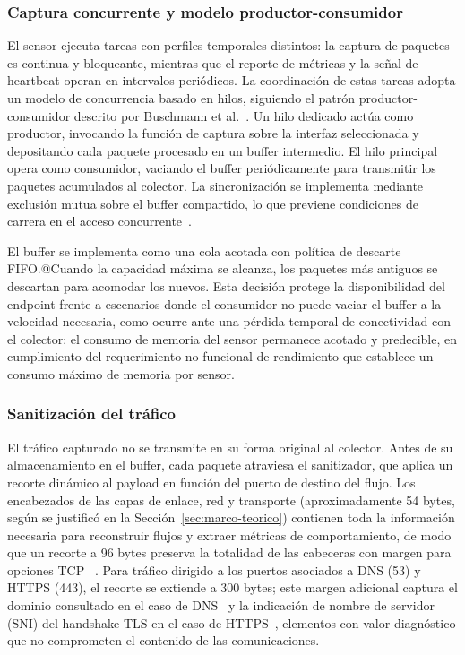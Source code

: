 \subsubsection{Captura concurrente y modelo productor-consumidor}

El sensor ejecuta tareas con perfiles temporales distintos: la 
captura de paquetes es continua y bloqueante, mientras que el 
reporte de métricas y la señal de heartbeat operan en intervalos 
periódicos. La coordinación de estas tareas adopta un modelo de 
concurrencia basado en hilos, siguiendo el patrón productor-consumidor 
descrito por Buschmann et al.~\cite{buschmann1996posa}. Un hilo 
dedicado actúa como productor, invocando la función de captura sobre 
la interfaz seleccionada y depositando cada paquete procesado en un 
buffer intermedio. El hilo principal opera como consumidor, vaciando 
el buffer periódicamente para transmitir los paquetes acumulados al 
colector. La sincronización se implementa mediante exclusión mutua 
sobre el buffer compartido, lo que previene condiciones de carrera 
en el acceso concurrente~\cite{silberschatz2018os}.

El buffer se implementa como una cola acotada con política de 
descarte FIFO.@Cuando la capacidad máxima se alcanza, los paquetes 
más antiguos se descartan para acomodar los nuevos. Esta decisión 
protege la disponibilidad del endpoint frente a escenarios donde el 
consumidor no puede vaciar el buffer a la velocidad necesaria, como 
ocurre ante una pérdida temporal de conectividad con el colector: 
el consumo de memoria del sensor permanece acotado y predecible, en 
cumplimiento del requerimiento no funcional de rendimiento que 
establece un consumo máximo de memoria por sensor.

\subsubsection{Sanitización del tráfico}

El tráfico capturado no se transmite en su forma original al 
colector. Antes de su almacenamiento en el buffer, cada paquete 
atraviesa el sanitizador, que aplica un recorte dinámico al payload 
en función del puerto de destino del flujo. Los encabezados de las 
capas de enlace, red y transporte (aproximadamente 54 bytes, según 
se justificó en la Sección~\ref{sec:marco-teorico}) contienen toda 
la información necesaria para reconstruir flujos y extraer métricas 
de comportamiento, de modo que un recorte a 96 bytes preserva la 
totalidad de las cabeceras con margen para opciones TCP 
~\cite{stevens2004unix}. Para tráfico dirigido a los puertos 
asociados a DNS (53) y HTTPS (443), el recorte se extiende a 300 
bytes; este margen adicional captura el dominio consultado en el 
caso de DNS~\cite{rfc1035} y la indicación de nombre de servidor 
(SNI) del handshake TLS en el caso de HTTPS~\cite{rfc8446}, 
elementos con valor diagnóstico que no comprometen el contenido de 
las comunicaciones.

